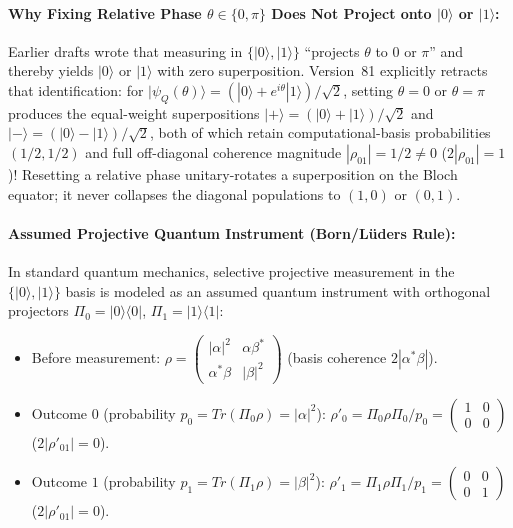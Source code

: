 \documentclass[american,11pt,letterpaper]{article}
\def\mathrm#1{#1}%
\def\emph#1{#1}%
\begin{document}
\paragraph{Why Fixing Relative Phase $\theta \in \{0, \pi\}$ Does \emph{Not} Project onto $|0\rangle$ or $|1\rangle$:}
Earlier drafts wrote that measuring in $\{|0\rangle, |1\rangle\}$ ``projects $\theta$ to $0$ or $\pi$'' and thereby yields $|0\rangle$ or $|1\rangle$ with zero superposition. Version~81 explicitly \emph{retracts} that identification: for $|\psi_{\mathrm{Q}}(\theta)\rangle = (|0\rangle + e^{i\theta}|1\rangle)/\sqrt{2}$, setting $\theta = 0$ or $\theta = \pi$ produces the equal-weight superpositions $|+\rangle = (|0\rangle + |1\rangle)/\sqrt{2}$ and $|-\rangle = (|0\rangle - |1\rangle)/\sqrt{2}$, \emph{both} of which retain computational-basis probabilities $(1/2, 1/2)$ and full off-diagonal coherence magnitude $|\rho_{01}| = 1/2 \ne 0$ ($2|\rho_{01}| = 1$)! Resetting a relative phase unitary-rotates a superposition on the Bloch equator; it never collapses the diagonal populations to $(1, 0)$ or $(0, 1)$.

\paragraph{Assumed Projective Quantum Instrument (Born/L\"uders Rule):}
In standard quantum mechanics, selective projective measurement in the $\{|0\rangle, |1\rangle\}$ basis is modeled as an assumed quantum instrument with orthogonal projectors $\Pi_0 = |0\rangle\langle 0|$, $\Pi_1 = |1\rangle\langle 1|$:
\begin{itemize}[leftmargin=2em]
  \item Before measurement: $\rho = \begin{pmatrix} |\alpha|^2 & \alpha\beta^* \\ \alpha^*\beta & |\beta|^2 \end{pmatrix}$ (basis coherence $2|\alpha^*\beta|$).
  \item Outcome $0$ (probability $p_0 = \mathrm{Tr}(\Pi_0\rho) = |\alpha|^2$): $\rho'_0 = \Pi_0\rho\Pi_0 / p_0 = \begin{pmatrix} 1 & 0 \\ 0 & 0 \end{pmatrix}$ ($2|\rho'_{01}| = 0$).
  \item Outcome $1$ (probability $p_1 = \mathrm{Tr}(\Pi_1\rho) = |\beta|^2$): $\rho'_1 = \Pi_1\rho\Pi_1 / p_1 = \begin{pmatrix} 0 & 0 \\ 0 & 1 \end{pmatrix}$ ($2|\rho'_{01}| = 0$).
\end{itemize}
\end{document}
